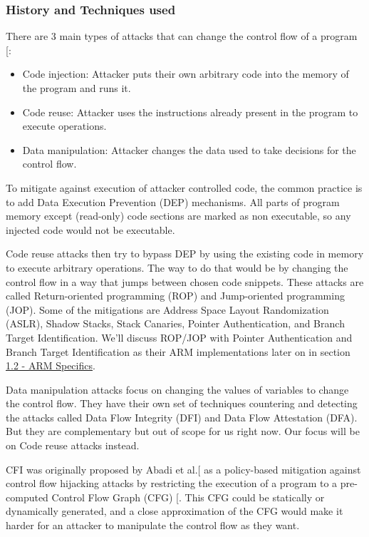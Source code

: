 \documentclass[a4paper, nobind]{templates/ociamthesis}
\providecommand{\tightlist}{%
  \setlength{\itemsep}{0pt}\setlength{\parskip}{0pt}}
\begin{document}
\subsubsection{History and Techniques used}\label{history-and-techniques-used}

There are 3 main types of attacks that can change the control flow of a program {[}\citeproc{ref-sok}{5}{]}:

\begin{itemize}
\tightlist
\item
  Code injection: Attacker puts their own arbitrary code into the memory of the program and runs it.
\item
  Code reuse: Attacker uses the instructions already present in the program to execute operations.
\item
  Data manipulation: Attacker changes the data used to take decisions for the control flow.
\end{itemize}

To mitigate against execution of attacker controlled code, the common practice is
to add Data Execution Prevention (DEP) mechanisms. All parts of program memory except
(read-only) code sections are marked as non executable, so any injected code would not be executable.

Code reuse attacks then try to bypass DEP by using the existing code in memory to
execute arbitrary operations. The way to do that would be by changing the control
flow in a way that jumps between chosen code snippets. These attacks are called
Return-oriented programming (ROP) and Jump-oriented programming (JOP).
Some of the mitigations are Address Space Layout Randomization (ASLR),
Shadow Stacks, Stack Canaries, Pointer Authentication, and Branch Target Identification.
We'll discuss ROP/JOP with Pointer Authentication and Branch Target
Identification as their ARM implementations later on in section \hyperref[arm-specifics]{1.2 - ARM Specifics}.

Data manipulation attacks focus on changing the values of variables to change the control flow.
They have their own set of techniques countering and detecting the attacks called
Data Flow Integrity (DFI) and Data Flow Attestation (DFA). But they are complementary
but out of scope for us right now. Our focus will be on Code reuse attacks instead.

CFI was originally proposed by Abadi et al.{[}\citeproc{ref-abadi2009control}{1}{]} as a policy-based mitigation
against control flow hijacking attacks by restricting the execution of a program
to a pre-computed Control Flow Graph (CFG) {[}\citeproc{ref-sok}{5}{]}. This CFG could be statically or
dynamically generated, and a close approximation of the CFG would make it harder
for an attacker to manipulate the control flow as they want.
\end{document}

